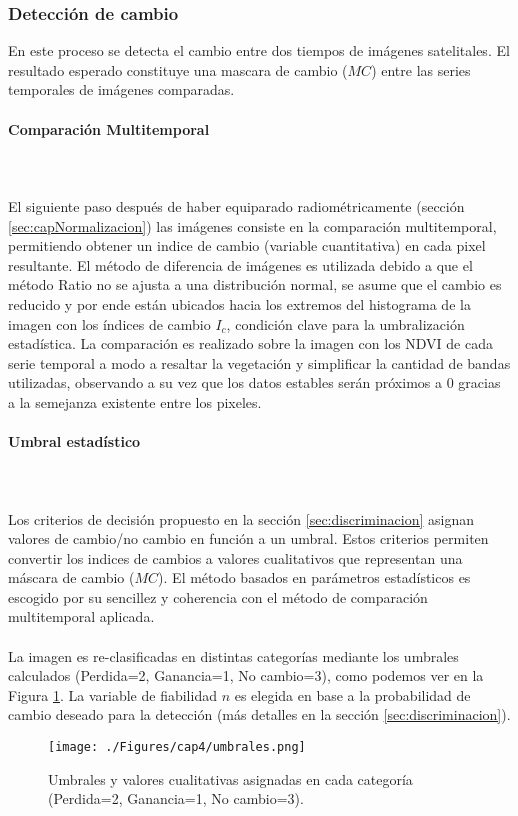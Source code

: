 \subsubsection{Detecci\'on de cambio}
En este proceso se detecta el cambio entre dos tiempos de im\'agenes satelitales. El resultado esperado constituye una mascara de cambio ($ MC $) entre las series temporales de im\'agenes comparadas. 
\paragraph{Comparaci\'on Multitemporal}\mbox{}\\\mbox{}\\
El siguiente paso despu\'es de haber equiparado radiom\'etricamente (secci\'on \ref{sec:capNormalizacion}) las im\'agenes consiste en la comparaci\'on multitemporal, permitiendo obtener un indice de cambio (variable cuantitativa) en cada pixel resultante. El m\'etodo de diferencia de im\'agenes es utilizada debido a que el m\'etodo Ratio no se ajusta a una distribuci\'on normal, se asume que el cambio es reducido y por ende est\'an ubicados hacia los extremos del histograma de la imagen con los \'indices de cambio $ I_{c} $, condici\'on clave para la umbralizaci\'on estad\'istica. La comparaci\'on es realizado sobre la imagen con los NDVI de cada serie temporal a modo a resaltar la vegetaci\'on y simplificar la cantidad de bandas utilizadas, observando a su vez que los datos estables ser\'an pr\'oximos a $ 0 $ gracias a la semejanza existente entre los pixeles. 
\paragraph{Umbral estad\'istico}\mbox{}\\\mbox{}\\
Los criterios de decisi\'on propuesto en la secci\'on \ref{sec:discriminacion} asignan valores de cambio/no cambio en funci\'on a un umbral. Estos criterios permiten convertir los indices de cambios a valores cualitativos que representan una m\'ascara de cambio ($ MC $). El m\'etodo basados en par\'ametros estad\'isticos es escogido por su sencillez y coherencia con el m\'etodo de comparaci\'on multitemporal aplicada. \\~\\
La imagen es re-clasificadas en distintas categor\'ias mediante los umbrales calculados (Perdida=2, Ganancia=1, No cambio=3), como podemos ver en la Figura \ref{fig:umbrales}.  La variable de fiabilidad $ n $ es elegida en base a la probabilidad de cambio deseado para la detecci\'on (m\'as detalles en la secci\'on \ref{sec:discriminacion}).
	\begin{figure}[H]
		\centering
		\texttt{[image: ./Figures/cap4/umbrales.png]}
		\caption{Umbrales y valores cualitativas asignadas en cada categor\'ia (Perdida=2, Ganancia=1, No cambio=3).}
		\label{fig:umbrales}
	\end{figure}

